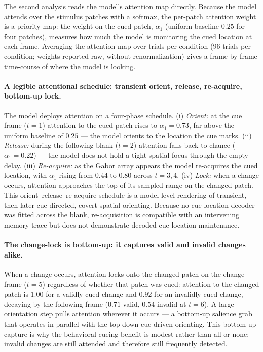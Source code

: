 The second analysis reads the model's attention map directly. Because the model
attends over the stimulus patches with a softmax, the per-patch attention weight is
a priority map: the weight on the cued patch, $\alpha_1$ (uniform baseline $0.25$
for four patches), measures how much the model is monitoring the cued location at
each frame. Averaging the attention map over trials per condition ($96$ trials per
condition; weights reported raw, without renormalization) gives a frame-by-frame
time-course of where the model is looking.

\paragraph{A legible attentional schedule: transient orient, release, re-acquire,
bottom-up lock.}
The model deploys attention on a four-phase schedule. (i) \emph{Orient:} at the cue
frame ($t = 1$) attention to the cued patch rises to $\alpha_1 = 0.73$, far above
the uniform baseline of $0.25$ --- the model orients to the location the cue marks.
(ii) \emph{Release:} during the following blank ($t = 2$) attention falls back to
chance ($\alpha_1 = 0.22$) --- the model does not hold a tight spatial focus through
the empty delay. (iii) \emph{Re-acquire:} as the Gabor array appears the model
re-acquires the cued location, with $\alpha_1$ rising from $0.44$ to $0.80$ across
$t = 3, 4$. (iv) \emph{Lock:} when a change occurs, attention approaches the top of its sampled
range on the changed patch. This orient--release--re-acquire schedule is a model-level rendering
of transient, then later cue-directed, covert spatial orienting. Because no
cue-location decoder was fitted across the blank, re-acquisition is compatible
with an intervening memory trace but does not demonstrate decoded cue-location maintenance.

\paragraph{The change-lock is bottom-up: it captures valid and invalid changes
alike.}
When a change occurs, attention locks onto the changed patch on the change frame
($t = 5$) regardless of whether that patch was cued: attention to the changed patch
is $1.00$ for a validly cued change and $0.92$ for an invalidly cued change, decaying
by the following frame ($0.71$ valid, $0.54$ invalid at $t = 6$). A large orientation
step pulls attention wherever it occurs --- a bottom-up salience grab that operates
in parallel with the top-down cue-driven orienting. This bottom-up capture is why
the behavioral cueing benefit is modest rather than all-or-none: invalid changes are
still attended and therefore still frequently detected.

